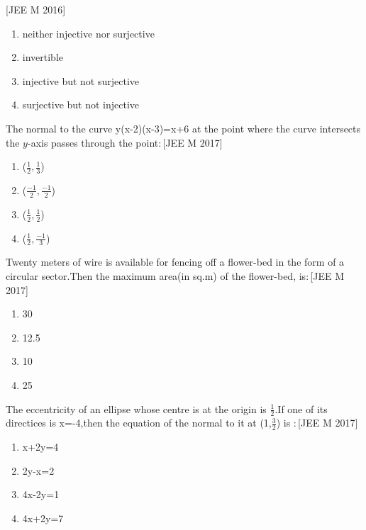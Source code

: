 \hfill[JEE M 2016]\\
\begin{enumerate}
    \item  neither injective nor surjective\\
    \item  invertible\\
    \item  injective but not surjective\\
    \item  surjective but not injective\\
\end{enumerate}
\item[35.] The normal to the curve y(x-2)(x-3)=x+6 at the point where the curve intersects the $y$-axis passes through the point$:$\hfill[JEE M 2017]
\begin{enumerate}
    \item  ($\frac{1}{2},\frac{1}{3}$)\\
    \item  ($\frac{-1}{2},\frac{-1}{2}$)\\
    \item  ($\frac{1}{2},\frac{1}{2}$)\\
    \item  ($\frac{1}{2},\frac{-1}{3}$)\\
\end{enumerate}
\item[36.] Twenty meters of wire is available for fencing off a flower-bed in the form of a circular sector.Then the maximum area(in sq.m) of the flower-bed, is$:$\hfill[JEE M 2017]\\
\begin{enumerate}
    \item  30\\
    \item  12.5\\
    \item  10\\
    \item  25\\
\end{enumerate}
\item[37.]The eccentricity of an ellipse whose centre is at the origin is $\frac{1}{2}$.If one of its directices is x=-4,then the equation of the normal to it at (1,$\frac{3}{2}$) is $:$\hfill[JEE M 2017]\\
\begin{enumerate}
    \item  x+2y=4\\
    \item  2y-x=2\\
    \item  4x-2y=1\\
    \item  4x+2y=7\\
\end{enumerate}

